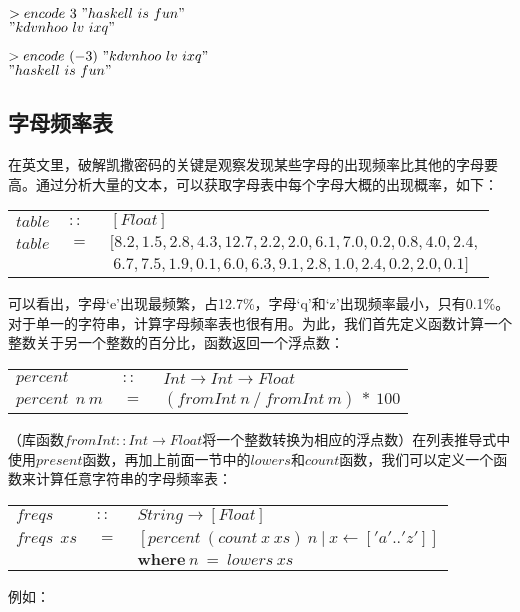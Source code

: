 \noindent\hspace*{1cm}$>encode~3~"haskell~is~fun"$\\
\hspace*{1cm}$"kdvnhoo~lv~ixq"$

\noindent\hspace*{1cm}$>encode~(-3)~"kdvnhoo~lv~ixq"$\\
\hspace*{1cm}$"haskell~is~fun"$

\subsection{字母频率表}
在英文里，破解凯撒密码的关键是观察发现某些字母的出现频率比其他的字母要高。通过分析大量的文本，可以获取字母表中每个字母大概的出现概率，如下：

\begin{tabular}[t]{lll}
  $table$&$~::~$&$[Float]$\\
  $table$&$~=~$&$[8.2, 1.5, 2.8, 4.3, 12.7, 2.2, 2.0, 6.1, 7.0, 0.2, 0.8, 4.0, 2.4,$\\
&&$~6.7, 7.5, 1.9, 0.1, 6.0, 6.3, 9.1, 2.8, 1.0, 2.4, 0.2, 2.0, 0.1]$\\
\end{tabular}

可以看出，字母‘e’出现最频繁，占12.7\%，字母‘q’和‘z’出现频率最小，只有0.1\%。对于单一的字符串，计算字母频率表也很有用。为此，我们首先定义函数计算一个整数关于另一个整数的百分比，函数返回一个浮点数：

\begin{tabular}[t]{lll}
  $percent$&$~::~$&$Int \rightarrow Int \rightarrow Float$\\
  $percent~~n~m$&$~=~$&$(fromInt~n~/~fromInt~m)~*~100$\\
\end{tabular}

（库函数$fromInt::Int \rightarrow Float$将一个整数转换为相应的浮点数）在列表推导式中使用$present$函数，再加上前面一节中的$lowers$和$count$函数，我们可以定义一个函数来计算任意字符串的字母频率表：


\begin{tabular}[t]{lll}
  $freqs$&$~::~$&$String \rightarrow [Float]$\\
  $freqs~~xs$&$~=~$&$[percent~(count~x~xs)~n~|~x \leftarrow ['a'..'z']]$\\
  &&$\textbf{where}~n~=~lowers~xs$
\end{tabular}

例如：

